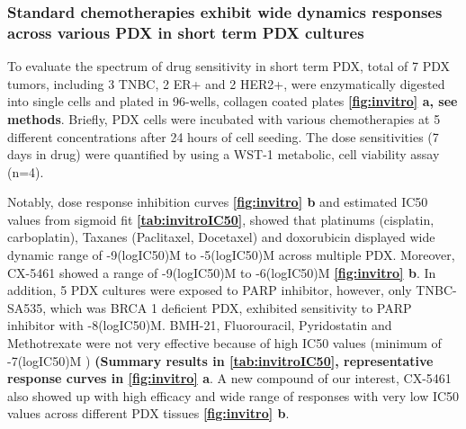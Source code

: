 \subsubsection{Standard chemotherapies exhibit wide dynamics responses across various PDX in short term PDX cultures}

To evaluate the spectrum of drug sensitivity in short term PDX,
total of 7 PDX tumors, including 3 TNBC, 2 ER+ and 2 HER2+, were enzymatically digested into single cells and plated in 96-wells, collagen coated plates \textbf{\autoref{fig:invitro} a, see methods}. 
Briefly, PDX cells were incubated with various chemotherapies at 5 different concentrations after 24 hours of cell seeding. The dose sensitivities (7 days in drug) were quantified by using a WST-1 metabolic, cell viability assay (n=4). 

Notably, dose response inhibition curves \textbf{\autoref{fig:invitro} b} and estimated IC50 values from sigmoid fit \textbf{\autoref{tab:invitroIC50}}, showed that platinums (cisplatin, carboplatin), Taxanes (Paclitaxel, Docetaxel) and doxorubicin displayed wide dynamic range of -9(logIC50)M to -5(logIC50)M across multiple PDX. Moreover, CX-5461 showed a range of -9(logIC50)M to -6(logIC50)M \textbf{\autoref{fig:invitro} b}. In addition, 5 PDX cultures were exposed to PARP inhibitor, however, only TNBC-SA535, which was BRCA 1 deficient PDX, exhibited sensitivity to PARP inhibitor with -8(logIC50)M. 
BMH-21, Fluorouracil, Pyridostatin and Methotrexate were not very effective because of high IC50 values (minimum of -7(logIC50)M ) \textbf{(Summary results in \autoref{tab:invitroIC50}, representative response curves in \autoref{fig:invitro} a}. A new compound of our interest, CX-5461 also showed up with high efficacy and wide range of responses with very low IC50 values across different PDX tissues \textbf{\autoref{fig:invitro} b}. 



